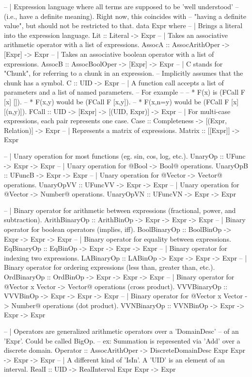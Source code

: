 \begin{haskell}
    -- | Expression language where all terms are supposed to be 'well understood'
    --   (i.e., have a definite meaning). Right now, this coincides with
    --   "having a definite value", but should not be restricted to that.
    data Expr where
    -- | Brings a literal into the expression language.
    Lit :: Literal -> Expr
    -- | Takes an associative arithmetic operator with a list of expressions.
    AssocA   :: AssocArithOper -> [Expr] -> Expr
    -- | Takes an associative boolean operator with a list of expressions.
    AssocB   :: AssocBoolOper  -> [Expr] -> Expr
    -- | C stands for "Chunk", for referring to a chunk in an expression.
    --   Implicitly assumes that the chunk has a symbol.
    C        :: UID -> Expr
    -- | A function call accepts a list of parameters and a list of named parameters.
    --   For example
    --
    --   * F(x) is (FCall F [x] []).
    --   * F(x,y) would be (FCall F [x,y]).
    --   * F(x,n=y) would be (FCall F [x] [(n,y)]).
    FCall    :: UID -> [Expr] -> [(UID, Expr)] -> Expr
    -- | For multi-case expressions, each pair represents one case.
    Case     :: Completeness -> [(Expr, Relation)] -> Expr
    -- | Represents a matrix of expressions.
    Matrix   :: [[Expr]] -> Expr

    -- | Unary operation for most functions (eg. sin, cos, log, etc.).
    UnaryOp       :: UFunc -> Expr -> Expr
    -- | Unary operation for @Bool -> Bool@ operations.
    UnaryOpB      :: UFuncB -> Expr -> Expr
    -- | Unary operation for @Vector -> Vector@ operations.
    UnaryOpVV     :: UFuncVV -> Expr -> Expr
    -- | Unary operation for @Vector -> Number@ operations.
    UnaryOpVN     :: UFuncVN -> Expr -> Expr

    -- | Binary operator for arithmetic between expressions (fractional, power, and subtraction).
    ArithBinaryOp :: ArithBinOp -> Expr -> Expr -> Expr
    -- | Binary operator for boolean operators (implies, iff).
    BoolBinaryOp  :: BoolBinOp -> Expr -> Expr -> Expr
    -- | Binary operator for equality between expressions.
    EqBinaryOp    :: EqBinOp -> Expr -> Expr -> Expr
    -- | Binary operator for indexing two expressions.
    LABinaryOp    :: LABinOp -> Expr -> Expr -> Expr
    -- | Binary operator for ordering expressions (less than, greater than, etc.).
    OrdBinaryOp   :: OrdBinOp -> Expr -> Expr -> Expr
    -- | Binary operator for @Vector x Vector -> Vector@ operations (cross product).
    VVVBinaryOp   :: VVVBinOp -> Expr -> Expr -> Expr
    -- | Binary operator for @Vector x Vector -> Number@ operations (dot product).
    VVNBinaryOp   :: VVNBinOp -> Expr -> Expr -> Expr

    -- | Operators are generalized arithmetic operators over a 'DomainDesc'
    --   of an 'Expr'.  Could be called BigOp.
    --   ex: Summation is represented via 'Add' over a discrete domain.
    Operator :: AssocArithOper -> DiscreteDomainDesc Expr Expr -> Expr -> Expr
    -- | A different kind of 'IsIn'. A 'UID' is an element of an interval.
    RealI    :: UID -> RealInterval Expr Expr -> Expr
\end{haskell}
